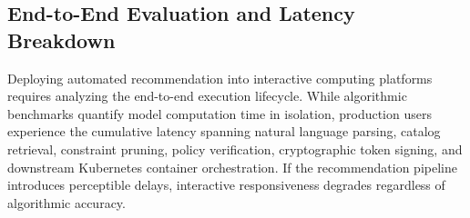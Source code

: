 \subsection{End-to-End Evaluation and Latency Breakdown}
\label{subsec:e2e_latency_breakdown}

Deploying automated recommendation into interactive computing platforms requires analyzing the end-to-end execution lifecycle. While algorithmic benchmarks quantify model computation time in isolation, production users experience the cumulative latency spanning natural language parsing, catalog retrieval, constraint pruning, policy verification, cryptographic token signing, and downstream Kubernetes container orchestration. If the recommendation pipeline introduces perceptible delays, interactive responsiveness degrades regardless of algorithmic accuracy.

